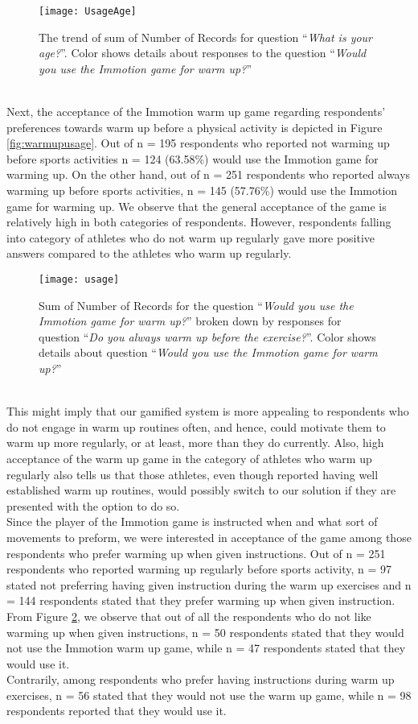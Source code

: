 \begin{figure}[h]
    \centering
    \texttt{[image: UsageAge]}
    \caption{The trend of sum of Number of Records for question ``\textit{What is your age?}''. Color shows details about responses to the question ``\textit{Would you use the Immotion game for warm up?}''}
    \label{fig:UsageAge}
\end{figure}\\
Next, the acceptance of the Immotion warm up game regarding respondents' preferences towards warm up before a physical activity is depicted in Figure \ref{fig:warmupusage}. Out of n = 195 respondents who reported not warming up before sports activities n = 124 (63.58\%) would use the Immotion game for warming up. On the other hand, out of n = 251 respondents who reported always warming up before sports activities, n = 145 (57.76\%) would use the Immotion game for warming up. We observe that the general acceptance of the game is relatively high in both categories of respondents. However, respondents falling into category of athletes who do not warm up regularly gave more positive answers compared to the athletes who warm up regularly.\\
\begin{figure}[h]
    \centering
    \texttt{[image: usage]}
    \caption{Sum of Number of Records for the question ``\textit{Would you use the Immotion game for warm up?}'' broken down by responses for question ``\textit{Do you always warm up before the exercise?}''. Color shows details about question ``\textit{Would you use the Immotion game for warm up?}''}
    \label{fig:usage}
\end{figure}\\
This might imply that our gamified system is more appealing to respondents who do not engage in warm up routines often, and hence, could motivate them to warm up more regularly, or at least, more than they do currently. Also, high acceptance of the warm up game in the category of athletes who warm up regularly also tells us that those athletes, even though reported having well established warm up routines, would possibly switch to our solution if they are presented with the option to do so. 
\\Since the player of the Immotion game is instructed when and what sort of movements to preform, we were interested in acceptance of the game among those respondents who prefer warming up when given instructions. Out of n = 251 respondents who reported warming up regularly before sports activity, n = 97 stated not preferring having given instruction during the warm up exercises and n = 144 respondents stated that they prefer warming up when given instruction. From Figure  \ref{fig:usage}, we observe that out of all the respondents who do not like warming up when given instructions, n = 50 respondents stated that they would not use the Immotion warm up game, while n = 47 respondents stated that they would use it. \\Contrarily, among respondents who prefer having instructions during warm up exercises, n = 56 stated that they would not use the warm up game, while n = 98 respondents reported that they would use it.\\
